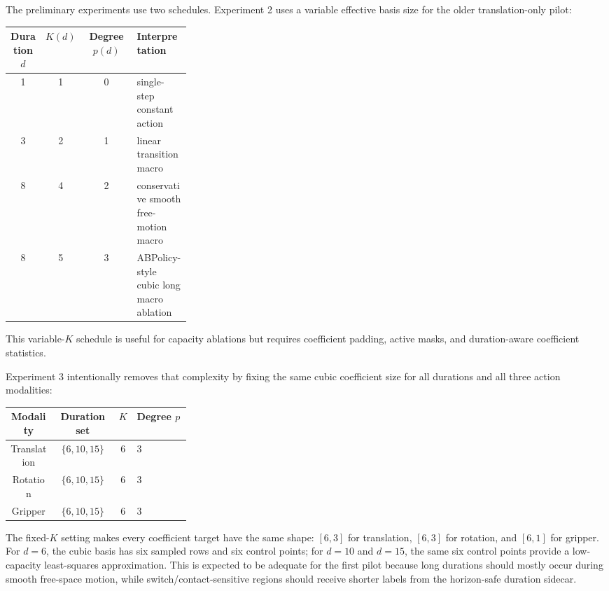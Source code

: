 \documentclass[10pt,twocolumn,letterpaper]{article}
\begin{document}
The preliminary experiments use two schedules. Experiment 2 uses a variable effective basis size for the older translation-only pilot:
\begin{center}
\small
\begin{tabular}{cccp{0.30\linewidth}}
\toprule
Duration $d$ & $K(d)$ & Degree $p(d)$ & Interpretation \\
\midrule
1 & 1 & 0 & single-step constant action \\
3 & 2 & 1 & linear transition macro \\
8 & 4 & 2 & conservative smooth free-motion macro \\
8 & 5 & 3 & ABPolicy-style cubic long macro ablation \\
\bottomrule
\end{tabular}
\end{center}
This variable-$K$ schedule is useful for capacity ablations but requires coefficient padding, active masks, and duration-aware coefficient statistics.

Experiment 3 intentionally removes that complexity by fixing the same cubic coefficient size for all durations and all three action modalities:
\begin{center}
\small
\begin{tabular}{cccp{0.30\linewidth}}
\toprule
Modality & Duration set & $K$ & Degree $p$ \\
\midrule
Translation & $\{6,10,15\}$ & 6 & 3 \\
Rotation & $\{6,10,15\}$ & 6 & 3 \\
Gripper & $\{6,10,15\}$ & 6 & 3 \\
\bottomrule
\end{tabular}
\end{center}
The fixed-$K$ setting makes every coefficient target have the same shape: $[6,3]$ for translation, $[6,3]$ for rotation, and $[6,1]$ for gripper. For $d=6$, the cubic basis has six sampled rows and six control points; for $d=10$ and $d=15$, the same six control points provide a low-capacity least-squares approximation. This is expected to be adequate for the first pilot because long durations should mostly occur during smooth free-space motion, while switch/contact-sensitive regions should receive shorter labels from the horizon-safe duration sidecar.
\end{document}
